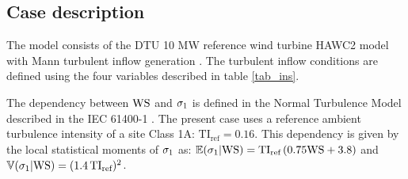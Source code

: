 \documentclass[preprint,12pt]{elsarticle}
\begin{document}
\subsection{Case description}

The model consists of the DTU 10 MW reference wind turbine HAWC2 model \cite{larsen20072, bak2012light} with Mann turbulent inflow generation \cite{Mann1998}. The turbulent inflow conditions are defined using the four variables described in table \ref{tab_ins}.

\begin{table}[!h]
\begin{centering}
\caption{Wind turbine model inputs.}
\label{tab_ins}
\end{centering}
\end{table}

The dependency between $\text{WS}$ and $\sigma_{1}$ is defined in the Normal Turbulence Model described in the IEC 61400-1 \cite{international2005iec}. The present case uses a reference ambient turbulence intensity of a site Class 1A:  $\text{TI}_{\text{ref}} = 0.16$. This dependency is given by the local statistical moments of $\sigma_{1}$ as: $\mathbb{E}(\sigma_{1}|\text{WS}) = \text{TI}_{\text{ref}} \, (0.75 \text{WS} + 3.8)$ and $\mathbb{V}(\sigma_{1}|\text{WS}) = (1.4 \,\text{TI}_{\text{ref}} )^2$. 
\end{document}
